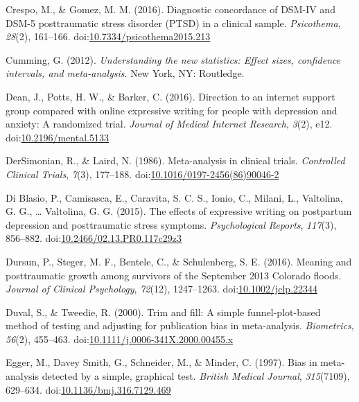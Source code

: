 \documentclass[man]{apa6}
\theoremstyle{definition}
\theoremstyle{definition}
\theoremstyle{definition}
\theoremstyle{remark}
\begin{document}
\hypertarget{ref-Crespo2016}{}
Crespo, M., \& Gomez, M. M. (2016). Diagnostic concordance of DSM-IV and
DSM-5 posttraumatic stress disorder (PTSD) in a clinical sample.
\emph{Psicothema}, \emph{28}(2), 161--166.
doi:\href{https://doi.org/10.7334/psicothema2015.213}{10.7334/psicothema2015.213}

\hypertarget{ref-Cumming2012}{}
Cumming, G. (2012). \emph{Understanding the new statistics: Effect
sizes, confidence intervals, and meta-analysis}. New York, NY:
Routledge.

\hypertarget{ref-Dean2016}{}
Dean, J., Potts, H. W., \& Barker, C. (2016). Direction to an internet
support group compared with online expressive writing for people with
depression and anxiety: A randomized trial. \emph{Journal of Medical
Internet Research}, \emph{3}(2), e12.
doi:\href{https://doi.org/10.2196/mental.5133}{10.2196/mental.5133}

\hypertarget{ref-DerSimonian1986}{}
DerSimonian, R., \& Laird, N. (1986). Meta-analysis in clinical trials.
\emph{Controlled Clinical Trials}, \emph{7}(3), 177--188.
doi:\href{https://doi.org/10.1016/0197-2456(86)90046-2}{10.1016/0197-2456(86)90046-2}

\hypertarget{ref-Blasio2015a}{}
Di Blasio, P., Camisasca, E., Caravita, S. C. S., Ionio, C., Milani, L.,
Valtolina, G. G., \ldots{} Valtolina, G. G. (2015). The effects of
expressive writing on postpartum depression and posttraumatic stress
symptoms. \emph{Psychological Reports}, \emph{117}(3), 856--882.
doi:\href{https://doi.org/10.2466/02.13.PR0.117c29z3}{10.2466/02.13.PR0.117c29z3}

\hypertarget{ref-Dursun2016}{}
Dursun, P., Steger, M. F., Bentele, C., \& Schulenberg, S. E. (2016).
Meaning and posttraumatic growth among survivors of the September 2013
Colorado floods. \emph{Journal of Clinical Psychology}, \emph{72}(12),
1247--1263.
doi:\href{https://doi.org/10.1002/jclp.22344}{10.1002/jclp.22344}

\hypertarget{ref-Duval2000}{}
Duval, S., \& Tweedie, R. (2000). Trim and fill: A simple
funnel-plot-based method of testing and adjusting for publication bias
in meta-analysis. \emph{Biometrics}, \emph{56}(2), 455--463.
doi:\href{https://doi.org/10.1111/j.0006-341X.2000.00455.x}{10.1111/j.0006-341X.2000.00455.x}

\hypertarget{ref-Egger1997}{}
Egger, M., Davey Smith, G., Schneider, M., \& Minder, C. (1997). Bias in
meta-analysis detected by a simple, graphical test. \emph{British
Medical Journal}, \emph{315}(7109), 629--634.
doi:\href{https://doi.org/10.1136/bmj.316.7129.469}{10.1136/bmj.316.7129.469}
\end{document}
